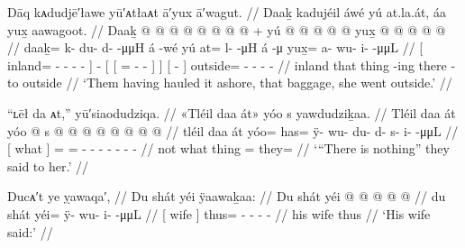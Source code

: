 \ex\label{ex:89-81-haul-go-outside}%
%
\begingl
	\glpreamble	Dāq kᴀdudjē′ławe yū′ᴀtłaᴀt ā′yux ā′wagut. //
	\glpreamble	Daaḵ kadujéil áwé yú at.la.át, áa yux̱ aawagoot. //
	\gla	{} Daaḵ @  @ {} @ {} @ {} @ {} @ {} @ {} {}
		 @ {} +
		{} yú {}  @ {} @ {} @ {} @ {} {} {}
		{}  @ {} {}
		yux̱ @  @ {} @ {} @ {} @ {} //
	\glb	{} daaḵ= k- {} du- d-  -μμH {} {}
		á -wé
		{} yú {} at= l-  -μH {} {} {}
		{} á -μ {}
		yux̱= a- wu- i-  -μμL //
	\glc	{}[ inland= - \· - -  - \· {}]
		 -
		{}[  {}[ = -  - \· {}] {}]
		{}[  - {}]
		outside= - - -  - //
	\gld	{} inland  {} {} {} {} {} {} {}
		 {}
		{} that {} thing\·  {} {} -ing {} {}
		{} there -to {}
		outside  {} {} {} {} //
	\glft	‘Them having hauled it ashore, that baggage, she went outside.’
		//
\endgl
\xe

\ex\label{ex:89-82-there-is-nothing-said}%
%
\begingl
	\glpreamble	“ʟēł da ᴀt,” yū′siaodudziqa. //
	\glpreamble	«\!Tléil daa át\!» yóo s yawdudziḵaa. //
	\gla	{} Tléil daa át {}
		yóo @ s @  @ {} @ {} @ {} @ {} @ {} @ {} @ {} //
	\glb	{} tléil daa át {}
		yóo= has= ÿ- wu- du- d- s- i-  -μμL //
	\glc	{}[  what  {}]
		= = - - - - - -  - //
	\gld	{} not what thing {}
		= they=  {} {} {} {} {} {} {} //
	\glft	‘“There is nothing” they said to her.’
		//
\endgl
\xe

\ex\label{ex:89-83-his-wife-said}%
%
\begingl
	\glpreamble	Ducᴀ′t ye ỵawaqa′, //
	\glpreamble	Du shát yéi ÿaawaḵaa: //
	\gla	{} Du shát {} yéi @  @ {} @ {} @ {} @ {} //
	\glb	{} du shát {} yéi= ÿ- wu- i-  -μμL //
	\glc	{}[  wife {}] thus= - - -  - //
	\gld	{} his wife {} thus  {} {} {} {} //
	\glft	‘His wife said:’
		//
\endgl
\xe


